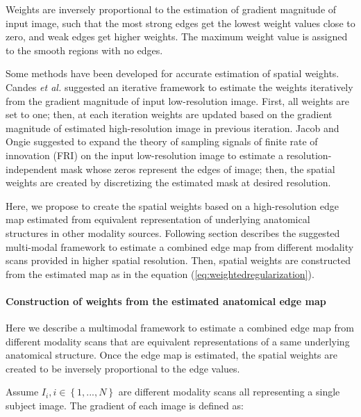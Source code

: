Weights are inversely proportional to the estimation of gradient magnitude of input image, such that the most strong edges get the lowest weight values close to zero, and weak edges get higher weights. The maximum weight value is assigned to the smooth regions with no edges.

Some methods have been developed for accurate estimation of spatial weights.
Candes \emph{et al.} \cite{candes2008enhancing} suggested an iterative framework to estimate the weights iteratively from the gradient magnitude of input low-resolution image. First, all weights are set to one; then, at each iteration weights are updated based on the gradient magnitude of estimated high-resolution image in previous iteration.
Jacob and Ongie \cite{ongie2015} suggested to expand the theory of sampling signals of finite rate of innovation (FRI) on the input low-resolution image to estimate a resolution-independent mask whose zeros represent the edges of image; then, the spatial weights are created by discretizing the estimated mask at desired resolution.

Here, we propose to create the spatial weights based on a high-resolution edge map estimated from equivalent representation of underlying anatomical structures in other modality sources.
Following section describes the suggested multi-modal framework to estimate a combined edge map from different modality scans provided in higher spatial resolution. Then, spatial weights are constructed from the estimated map as in the equation (\ref{eq:weightedregularization}).

\paragraph{Construction of weights from the estimated anatomical edge map}
\label{section:estimateLabelMap}

Here we describe a multimodal framework to estimate a combined edge map from different modality scans that are equivalent representations of a same underlying anatomical structure. Once the edge map is estimated, the spatial weights are created to be inversely proportional to the edge values.

Assume $I_{i}, i\in \left \{ 1,...,N \right \}$ are different modality scans all representing a single subject image. The gradient of each image is defined as:

